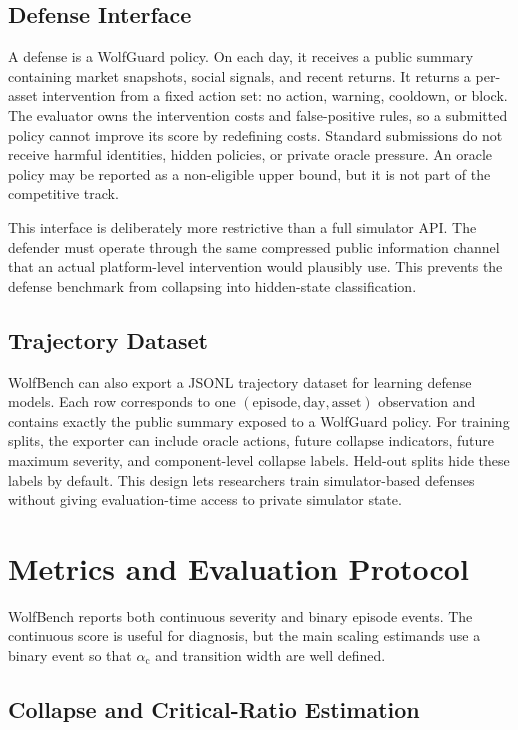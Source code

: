 \documentclass[letterpaper]{article} %
\newcommand{\alphac}{\alpha_{\mathrm{c}}}
\begin{document}
\subsection{Defense Interface}

A defense is a WolfGuard policy. On each day, it receives a public summary
containing market snapshots, social signals, and recent returns. It returns a
per-asset intervention from a fixed action set: no action, warning, cooldown,
or block. The evaluator owns the intervention costs and false-positive rules,
so a submitted policy cannot improve its score by redefining costs. Standard
submissions do not receive harmful identities, hidden policies, or private
oracle pressure. An oracle policy may be reported as a non-eligible upper bound,
but it is not part of the competitive track.

This interface is deliberately more restrictive than a full simulator API. The
defender must operate through the same compressed public information channel
that an actual platform-level intervention would plausibly use. This prevents
the defense benchmark from collapsing into hidden-state classification.

\subsection{Trajectory Dataset}

WolfBench can also export a JSONL trajectory dataset for learning defense
models. Each row corresponds to one
\((\mathrm{episode},\mathrm{day},\mathrm{asset})\) observation and contains
exactly the public summary exposed to a WolfGuard policy. For training splits,
the exporter can include oracle actions, future collapse indicators, future
maximum severity, and component-level collapse labels. Held-out splits hide
these labels by default. This design lets researchers train simulator-based
defenses without giving evaluation-time access to private simulator state.

\section{Metrics and Evaluation Protocol}

WolfBench reports both continuous severity and binary episode events. The
continuous score is useful for diagnosis, but the main scaling estimands use a
binary event so that \(\alphac\) and transition width are well defined.

\subsection{Collapse and Critical-Ratio Estimation}
\end{document}

